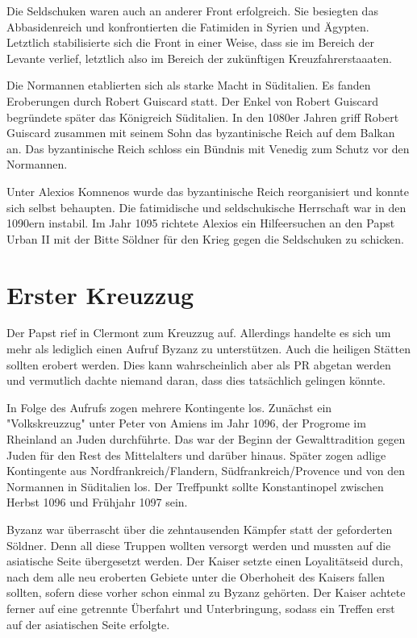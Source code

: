 \documentclass[10pt,a4paper,oneside,ngerman,numbers=noenddot]{scrartcl}
\begin{document}
Die Seldschuken waren auch an anderer Front erfolgreich. Sie besiegten das
Abbasidenreich und konfrontierten die Fatimiden in Syrien und Ägypten. Letztlich
stabilisierte sich die Front in einer Weise, dass sie im Bereich der Levante
verlief, letztlich also im Bereich der zukünftigen Kreuzfahrerstaaaten.

Die Normannen etablierten sich als starke Macht in Süditalien. Es fanden
Eroberungen durch Robert Guiscard statt. Der Enkel von Robert Guiscard begründete
später das Königreich Süditalien. In den 1080er Jahren griff Robert Guiscard
zusammen mit seinem Sohn das byzantinische Reich auf dem Balkan an. Das byzantinische
Reich schloss ein Bündnis mit Venedig zum Schutz vor den Normannen.

Unter Alexios Komnenos wurde das byzantinische Reich reorganisiert und konnte
sich selbst behaupten. Die fatimidische und seldschukische Herrschaft war
in den 1090ern instabil. Im Jahr 1095 richtete Alexios ein Hilfeersuchen
an den Papst Urban II mit der Bitte Söldner für den Krieg gegen die Seldschuken
zu schicken.

\section{Erster Kreuzzug}

Der Papst rief in Clermont zum Kreuzzug auf. Allerdings handelte es sich um mehr
als lediglich einen Aufruf Byzanz zu unterstützen. Auch die heiligen Stätten
sollten erobert werden. Dies kann wahrscheinlich aber als PR abgetan werden
und vermutlich dachte niemand daran, dass dies tatsächlich gelingen könnte.

In Folge des Aufrufs zogen mehrere Kontingente los. Zunächst ein "Volkskreuzzug"
unter Peter von Amiens im Jahr 1096, der Progrome im Rheinland an Juden durchführte.
Das war der Beginn der Gewalttradition gegen Juden für den Rest des Mittelalters
und darüber hinaus. Später zogen adlige Kontingente aus Nordfrankreich/Flandern,
Südfrankreich/Provence und von den Normannen in Süditalien los. Der Treffpunkt
sollte Konstantinopel zwischen Herbst 1096 und Frühjahr 1097 sein.

Byzanz war überrascht über die zehntausenden Kämpfer statt der geforderten
Söldner. Denn all diese Truppen wollten versorgt werden und mussten auf die
asiatische Seite übergesetzt werden. Der Kaiser setzte einen Loyalitätseid durch,
nach dem alle neu eroberten Gebiete unter die Oberhoheit des Kaisers fallen
sollten, sofern diese vorher schon einmal zu Byzanz gehörten. Der Kaiser
achtete ferner auf eine getrennte Überfahrt und Unterbringung, sodass ein Treffen
erst auf der asiatischen Seite erfolgte.
\end{document}
